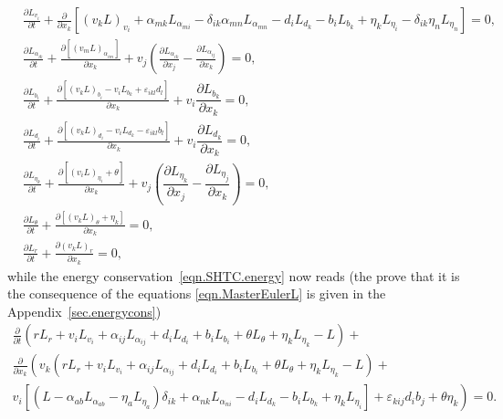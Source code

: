 \documentclass[twoside]{article}
\newcommand{\pd}{\partial}
\begin{document}
\begin{subequations}\label{eqn.MasterEulerL}
	\begin{align}
	& \frac{\pd L_{v_i}}{\pd t} + \frac{\pd}{\pd x_k}  
	\left[(v_k L)_{v_i}  + 
	\alpha_{mk}L_{\alpha_{mi}} - \delta_{ik}\alpha_{mn}L_{\alpha_{mn}} 
	- d_i L_{d_k} - b_i L_{b_k} + 
	\eta_{k}L_{\eta_{i}} - \delta_{ik}\eta_n L_{\eta_n}\right] = 
	0, 
	\label{eqn.MasterEulerL.Momentum}\\[2mm]
	& \frac{\pd L_{\alpha_{ik}}}{\pd t} + \frac{\pd  [(v_m 
	L)_{\alpha_{im}}]}{\pd x_k} + 
	v_j\left(\frac{\pd L_{\alpha_{ik}}}{\pd 
		x_j}-\frac{\pd L_{\alpha_{ij}}}{\pd x_k}\right)= 
	0, \label{eqn.MasterEulerL.F}\\[2mm]
	& \frac{\pd L_{b_{i}}}{\pd t}+\frac{\pd[ {(v_kL)_{b_i}} - 
	v_iL_{b_k}+\varepsilon_{ikl}d_l]}{\pd x_k}+v_i \dfrac{\pd L_{b_k}}{\pd 
	x_k}=0,\label{eqn.MasterEulerL.Magn}\\[2mm]
	& \frac{\pd L_{d_{i}}}{\pd t}+\frac{\pd[ {(v_kL)_{d_i}} - 
	v_iL_{d_k}-\varepsilon_{ikl}b_l]}{\pd x_k}+v_i \dfrac{\pd L_{d_k}}{\pd 
	x_k} = 
	0, \label{eqn.MasterEulerL.Electr}\\[2mm]
	& \frac{\pd L_{\eta_k}}{\pd t}+\frac{\pd[ 
	(v_i L)_{\eta_i} + \theta]}{\pd x_k} + v_j\left(\dfrac{\pd 
		L_{\eta_k}}{\pd x_j}-\dfrac{\pd L_{\eta_j}}{\pd x_k}\right)= 0,  
	\label{eqn.MasterEulerL.Heat}\\[2mm]
	& \frac{\pd L_{\theta}}{\pd t}+\frac{\pd[ 
	(v_k L)_\theta+\eta_k]}{\pd x_k}=0,
	\label{eqn.MasterEulerL.Entropy}\\[2mm]
	& \frac{\pd L_r}{\pd t} + \frac{\pd  (v_k 
	L)_r}{\pd x_k} = 0, \label{eqn.MasterEulerL.Mass}
	\end{align}
\end{subequations}
while the energy conservation~\eqref{eqn.SHTC.energy} now reads 
(the prove that it is the consequence of the equations 
\eqref{eqn.MasterEulerL} is given in the Appendix~\ref{sec.energycons})
\begin{multline}\label{eqn.energyL}
\frac{\pd }{\pd t}(r L_r + v_i L_{v_i} + \alpha_{ij} L_{\alpha _{ij}} + d_i 
L_{d_i} + b_i L_{b_i} + \theta L_\theta + \eta_k L_{\eta_k} - L) + \\
\frac{\pd }{\pd x_k}\left(v_k\left(r L_r + v_i L_{v_i} + \alpha_{ij} 
L_{\alpha _{ij}} + d_i L_{d_i} + b_i L_{b_i} + \theta L_\theta + \eta_k 
L_{\eta_k} - L\right) + \right.\\
\left. v_i\left[\left(L - \alpha_{ab} L_{\alpha_{ab}} - \eta_a L_{\eta_a} 
\right) \delta_{ik} + \alpha_{nk} L_{\alpha_{ni}} - d_i L_{d_k} - b_i 
L_{b_k} + \eta_k L_{\eta_i}\right] + \varepsilon_{kij} 
d_i b_j +  \theta \eta_k \right)=0.
\end{multline}
\end{document}

